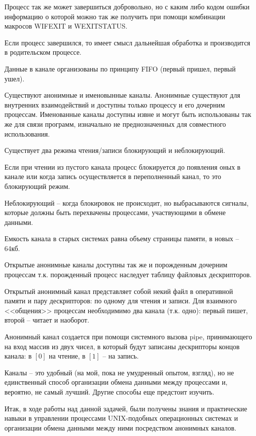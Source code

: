 \documentclass[12pt]{article}
\begin{document}
Процесс так же может завершиться добровольно, но с каким либо кодом ошибки информацию о которой можно так же получить при помощи комбинации макросов WIFEXIT и WEXITSTATUS.

Если процесс завершился, то имеет смысл дальнейшая обработка и производится в родительском процессе.

Данные в канале организованы по принципу FIFO (первый пришел, первый ушел).

Существуют анонимные и именовынные каналы. Анонимные существуют для внутренних взаимодействий и доступны только процессу и его дочерним процессам. Именованные каналы доступны извне и могут быть использованы так же для связи программ, изначально не преднозначенных для совместного использования.

Существует два режима чтения/записи блокирующий и неблокирующий.

Если при чтении из пустого канала процесс блокируется до появления оных в канале
или когда запись осуществляется в переполненный канал, то это блокирующий режим. 

Неблокирующий -- когда блокировок не происходит, но выбрасываются сигналы, которые должны быть перехвачены процессами, участвующими в обмене данными.

Емкость канала в старых системах равна объему страницы памяти, в новых -- 64кб.

Открытые анонимные каналы доступны так же и порожденным дочерним процессам т.к. порожденный процесс наследует таблицу файловых дескрипторов. 

Открытый анонимный канал представляет собой некий файл в оперативной памяти и пару дескрипторов: по одному для чтения и записи. Для взаимного <<общения>> процессам необходимимо два канала (т.к. одно): первый пишет, второй -- читает и наоборот.

Анонимный канал создается при помощи системного вызова pipe, принимающего на вход массив из двух чисел,  
в который будут записаны дескрипторы концов канала: в $[0]$ на чтение, в $[1]$ -- на запись.

Каналы -- это удобный (на мой, пока не умудренный опытом, взгляд), но не единственный способ организации обмена данными между процессами и, вероятно, не самый лучший. Другие способы еще предстоит изучить.

Итак, в ходе работы над данной задачей, были получены знания и практические навыки в управлении процессами UNIX-подобных операционных системах и организации обмена данными между ними посредством анонимных каналов.
\end{document}
